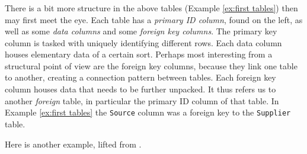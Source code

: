 \documentclass[CT4S-EN-RU]{subfiles}
\begin{document}
\begin{exampleRUS}\label{ex:graphene}
\end{exampleRUS}


\subsubsection{}

\begin{blockENG}
There is a bit more structure in the above tables (Example \ref{ex:first tables}) then may first meet the eye. Each table has a {\em primary ID column}, found on the left, as well as some {\em data columns} and some {\em foreign key columns}. The primary key column is tasked with uniquely identifying different rows. Each data column houses elementary data of a certain sort. Perhaps most interesting from a structural point of view are the foreign key columns, because they link one table to another, creating a connection pattern between tables. Each foreign key column houses data that needs to be further unpacked. It thus refers us to another {\em foreign} table, in particular the primary ID column of that table. In Example \ref{ex:first tables} the {\tt Source} column was a foreign key to the {\tt Supplier} table.
\end{blockENG}

\begin{blockRUS}
\end{blockRUS}

\begin{blockENG}
Here is another example, lifted from \cite{Sp2}.
\end{blockENG}

\begin{blockRUS}
\end{blockRUS}
\end{document}
